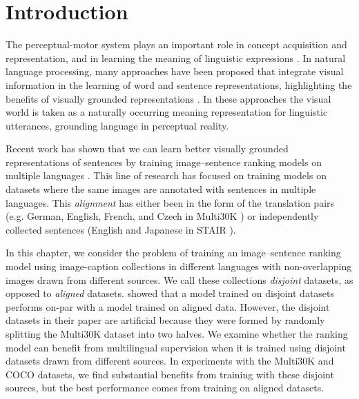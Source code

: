 \section{Introduction}

The perceptual-motor system plays an important role 
in concept acquisition and representation, 
and in learning the meaning of linguistic expressions
\citep{pulvermuller2005brain}. In natural language 
processing, many approaches have been proposed that
integrate visual information in the learning of 
word and sentence representations, highlighting
the benefits of visually grounded representations
\citep{lazaridou2015combining,baroni2016grounding,kiela2017learning,elliott2017imagination}.
In these approaches the visual world is
taken as a naturally occurring meaning representation for 
linguistic utterances, grounding language in perceptual
reality.

 Recent work has shown that we can learn better 
 visually grounded representations of sentences by
 training image--sentence ranking models on 
 multiple languages \citep{gella2017image,kadar2018conll}. 
 This line of research has
 focused on training models on datasets where the same 
 images are annotated with sentences in multiple languages. 
 This \emph{alignment} has
 either been in the form of the translation pairs 
 (e.g. German, English, French, and Czech in
 Multi30K \citep{W16-3210}) or independently collected
 sentences (English and Japanese in STAIR
 \citep{Yoshikawa2017}). 
 
  In this chapter, we consider the problem of training an image--sentence ranking model using image-caption collections 
 in different languages with non-overlapping images drawn from different sources. 
 We call these collections \emph{disjoint} datasets, as opposed to
 \emph{aligned} datasets.  \cite{kadar2018conll} showed that a
 model trained on disjoint datasets performs on-par with a model
 trained on aligned data. However, the disjoint datasets in their paper are artificial because they were formed by randomly splitting the Multi30K dataset into two halves. We examine whether the ranking model
 can benefit from multilingual supervision when it is
 trained using disjoint datasets drawn from different
 sources. In experiments with the Multi30K and COCO datasets,
 we find substantial benefits from training with these disjoint sources, but the best performance 
 comes from training on aligned datasets.
 
